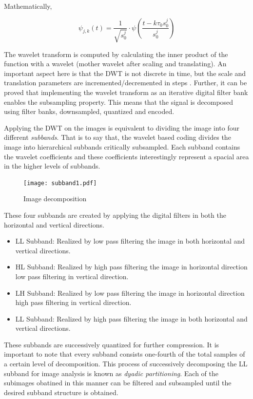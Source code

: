 \documentclass[./A14_Report.tex]{subfiles}
\begin{document}
Mathematically,

$$\psi_{j,k}(t) = \frac{1}{\sqrt{s_{0}^j}} \cdot \psi \left (\frac{t - k \tau_{0}s_{0}^j}{s_{0}^j} \right )$$

The wavelet transform is computed by calculating the inner product of the function with
a wavelet (mother wavelet after scaling and translating).
An important aspect here is that the DWT is not discrete in time, but the scale and 
translation parameters are incremented/decremented in steps \cite{valwav1999}. 
Further, it can be proved that implementing the wavelet transform as an iterative 
digital filter bank enables the subsampling property. This means that the signal is decomposed 
using filter banks, downsampled, quantized and encoded. 

\par

Applying the DWT on the images is equivalent to dividing the image into four different
\textit{subbands}. That is to say that, the wavelet based coding divides the image into hierarchical 
subbands critically subsampled. Each subband contains the wavelet coefficients and 
these coefficients interestingly represent a spacial area in the higher levels of subbands.

\FloatBarrier
\begin{figure}[htpb]
    \centering
    \texttt{[image: subband1.pdf]}
    \caption{Image decomposition}%
    \label{fig:subband1}
\end{figure}
\FloatBarrier

\pagebreak

These four subbands are created by applying the digital filters in both the horizontal and vertical
directions. 
\begin{itemize}
    \item LL Subband: Realized by low pass filtering the image in both horizontal and vertical directions.
    \item HL Subband: Realized by high pass filtering the image in horizontal direction low pass filtering in vertical direction.
    \item LH Subband: Realized by low pass filtering the image in horizontal direction high pass filtering in vertical direction.
    \item LL Subband: Realized by high pass filtering the image in both horizontal and vertical directions.
\end{itemize}

These subbands are successively quantized for further compression. It is important to note that
every subband consists one-fourth of the total samples of a certain level of decomposition.
This process of successively decomposing the LL subband for image analysis is known as 
\textit{dyadic partitioning}.
Each of the subimages obatined in this manner can be filtered and subsampled until the
desired subband structure is obtained.
\end{document}
